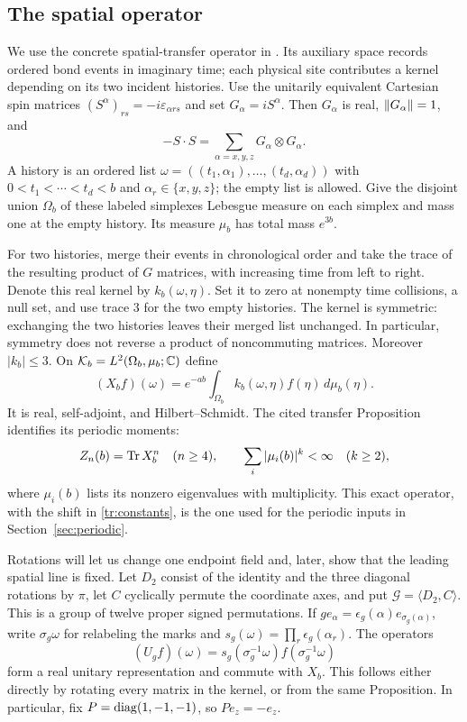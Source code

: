 \subsection{The spatial operator}
We use the concrete spatial-transfer operator in
\cite[Proposition 3.1]{periodic}. Its auxiliary space records ordered
bond events in imaginary time; each physical site contributes a kernel
depending on its two incident histories. Use the unitarily equivalent
Cartesian
spin matrices $(S^\alpha)_{rs}=-i\varepsilon_{\alpha rs}$ and set
$G_\alpha=iS^\alpha$. Then $G_\alpha$ is real,
$\lVert G_\alpha\rVert=1$, and
\[
 -S\cdot S=\sum_{\alpha=x,y,z}G_\alpha\otimes G_\alpha.
\]
A history is an ordered list
$\omega=((t_1,\alpha_1),\ldots,(t_d,\alpha_d))$ with
$0<t_1<\cdots<t_d<b$ and $\alpha_r\in\{x,y,z\}$; the empty list
is allowed. Give the disjoint union $\Omega_b$ of these labeled
simplexes Lebesgue measure on each simplex and mass one at the empty
history. Its measure $\mu_b$ has total mass $e^{3b}$.

For two histories, merge their events in chronological order and take
the trace of the resulting product of $G$ matrices, with increasing
time from left to right. Denote this real kernel by $k_b(\omega,\eta)$.
Set it to zero at nonempty time
collisions, a null set, and use trace $3$ for the two empty histories.
The kernel is symmetric: exchanging the two histories leaves their
merged list unchanged. In particular, symmetry does not reverse a
product of noncommuting matrices. Moreover $|k_b|\le3$.
On $\mathcal K_b=L^2(\Omega_b,\mu_b;\mathbb C)$ define
\begin{equation}\label{tr:operator}
 (X_bf)(\omega)=e^{-ab}\int_{\Omega_b}k_b(\omega,\eta)
                                      f(\eta)\,d\mu_b(\eta).
\end{equation}
It is real, self-adjoint, and Hilbert--Schmidt. The cited transfer
Proposition identifies its periodic moments:
\begin{equation}\label{tr:periodic}
 Z_n(b)=\operatorname{Tr} X_b^n\quad(n\ge4),\qquad
 \sum_i|\mu_i(b)|^k<\infty\quad(k\ge2),
\end{equation}
where $\mu_i(b)$ lists its nonzero eigenvalues with multiplicity.
This exact operator, with the shift in \eqref{tr:constants}, is the one
used for the periodic inputs in Section~\ref{sec:periodic}.

Rotations will let us change one endpoint field and, later, show that
the leading spatial line is fixed. Let $D_2$ consist of the identity
and the three diagonal rotations by
$\pi$, let $C$ cyclically permute the coordinate axes, and put
$\mathcal G=\langle D_2,C\rangle$. This is a group of twelve proper
signed permutations. If $ge_\alpha=\epsilon_g(\alpha)
e_{\sigma_g(\alpha)}$, write $\sigma_g\omega$ for relabeling the
marks and $s_g(\omega)=\prod_r\epsilon_g(\alpha_r)$. The operators
\begin{equation}\label{tr:rotations}
 (U_gf)(\omega)=s_g(\sigma_g^{-1}\omega)f(\sigma_g^{-1}\omega)
\end{equation}
form a real unitary representation and commute with $X_b$. This follows
either directly by rotating every matrix in the kernel, or from the
same Proposition. In particular, fix
$P=\operatorname{diag}(1,-1,-1)$, so $Pe_z=-e_z$.

